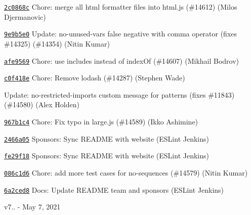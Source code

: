 \begin{DoxyItemize}
\item \href{https://github.com/eslint/eslint/commit/2c0868cbeadc9f42716fa1178ebdc6b4cee6d31e}{\texttt{ {\ttfamily 2c0868c}}} Chore\+: merge all html formatter files into {\ttfamily html.\+js} (\#14612) (Milos Djermanovic)
\item \href{https://github.com/eslint/eslint/commit/9e9b5e07475564813b62cd1d7562a93c5fb4bc74}{\texttt{ {\ttfamily 9e9b5e0}}} Update\+: no-\/unused-\/vars false negative with comma operator (fixes \#14325) (\#14354) (Nitin Kumar)
\item \href{https://github.com/eslint/eslint/commit/afe95693e1e4316a1c6f01d39345061d4c5921c7}{\texttt{ {\ttfamily afe9569}}} Chore\+: use includes instead of index\+Of (\#14607) (Mikhail Bodrov)
\item \href{https://github.com/eslint/eslint/commit/c0f418e2476df98519bc156b81d20431984e8704}{\texttt{ {\ttfamily c0f418e}}} Chore\+: Remove lodash (\#14287) (Stephen Wade)
\item \href{https://github.com/eslint/eslint/commit/52655dd54925ee02af2ba3a0ebc09de959ae3101}{\texttt{ {\ttfamily 52655dd}}} Update\+: no-\/restricted-\/imports custom message for patterns (fixes \#11843) (\#14580) (Alex Holden)
\item \href{https://github.com/eslint/eslint/commit/967b1c4ceca8f5248378477da94ff118dafaa647}{\texttt{ {\ttfamily 967b1c4}}} Chore\+: Fix typo in large.\+js (\#14589) (Ikko Ashimine)
\item \href{https://github.com/eslint/eslint/commit/2466a05160de60958457d984b79fd445c12ebc98}{\texttt{ {\ttfamily 2466a05}}} Sponsors\+: Sync README with website (ESLint Jenkins)
\item \href{https://github.com/eslint/eslint/commit/fe29f18227fd02fd7c3da033417d621275b00d0a}{\texttt{ {\ttfamily fe29f18}}} Sponsors\+: Sync README with website (ESLint Jenkins)
\item \href{https://github.com/eslint/eslint/commit/086c1d6e8593cf8e7851daa8f2a890c213cf6999}{\texttt{ {\ttfamily 086c1d6}}} Chore\+: add more test cases for {\ttfamily no-\/sequences} (\#14579) (Nitin Kumar)
\item \href{https://github.com/eslint/eslint/commit/6a2ced892c0dc43fa4942293b9f1c4b9151c3741}{\texttt{ {\ttfamily 6a2ced8}}} Docs\+: Update README team and sponsors (ESLint Jenkins)
\end{DoxyItemize}

v7.. -\/ May 7, 2021


